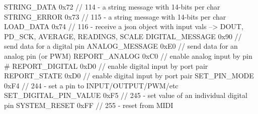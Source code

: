 STRING_DATA             0x72 // 114 - a string message with 14-bits per char
STRING_ERROR            0x73 // 115 - a string message with 14-bits per char
LOAD_DATA               0x74 // 116 - receive a json object with input vals --> DOUT, PD_SCK, AVERAGE, READINGS, SCALE
DIGITAL_MESSAGE         0x90 // send data for a digital pin
ANALOG_MESSAGE          0xE0 // send data for an analog pin (or PWM)
REPORT_ANALOG           0xC0 // enable analog input by pin #
REPORT_DIGITAL          0xD0 // enable digital input by port pair
REPORT_STATE            0xD0 // enable digital input by port pair
SET_PIN_MODE            0xF4 // 244 - set a pin to INPUT/OUTPUT/PWM/etc
SET_DIGITAL_PIN_VALUE   0xF5 // 245 - set value of an individual digital pin
SYSTEM_RESET            0xFF // 255 - reset from MIDI
